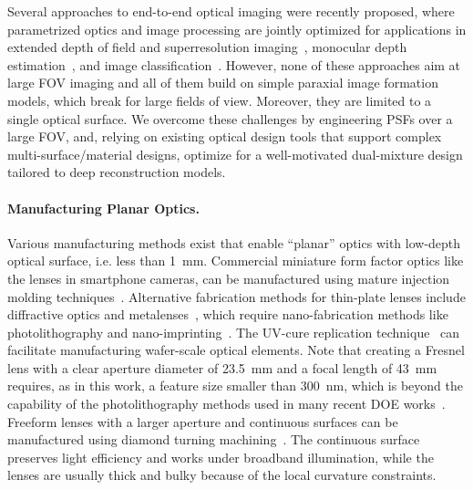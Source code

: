 Several approaches to end-to-end optical imaging were recently proposed, where parametrized optics and image processing are jointly optimized for applications in extended depth of field and superresolution imaging~\cite{sitzmann2018end}, monocular depth estimation~\cite{Haim:2018,Wu:2019,chang2019deep}, and image classification~\cite{chang2018hybrid}. However, none of these approaches aim at large FOV imaging and all of them build on simple paraxial image formation models, which break for large fields of view. Moreover, they are limited to a single optical surface. We overcome these challenges by engineering PSFs over a large FOV, and, relying on existing optical design tools that support complex multi-surface/material designs, optimize for a well-motivated dual-mixture design tailored to deep reconstruction models.



\paragraph{Manufacturing Planar Optics.}

Various manufacturing methods exist that enable ``planar'' optics with low-depth optical surface, i.e. less than 1~mm. 
Commercial miniature form factor optics like the lenses in smartphone cameras,
can be manufactured using mature injection molding techniques~\cite{oliver2010imaging}.
Alternative fabrication methods for thin-plate lenses include diffractive optics and metalenses~\cite{duoshu2011fabrication,genevet2017recent}, which require 
nano-fabrication methods like photolithography and nano-imprinting~\cite{ahn2009large,chou1996nanoimprint}. The UV-cure replication technique~\cite{zoberbier2009wafer} can facilitate manufacturing wafer-scale optical elements.
Note that creating a Fresnel lens with a clear aperture
  diameter of 23.5~mm and a focal length of 43~mm requires, as in this work, a feature size
  smaller than 300~nm, which is beyond the capability of the
  photolithography methods used in many recent DOE works~\cite{heide2016encoded,peng2016diffractive,sitzmann2018end}.
Freeform lenses with a larger aperture and continuous surfaces can be manufactured using diamond turning machining~\cite{fang2013manufacturing}. The continuous surface preserves light efficiency and works under broadband illumination, while the lenses are usually thick and bulky because of the local curvature constraints. 

